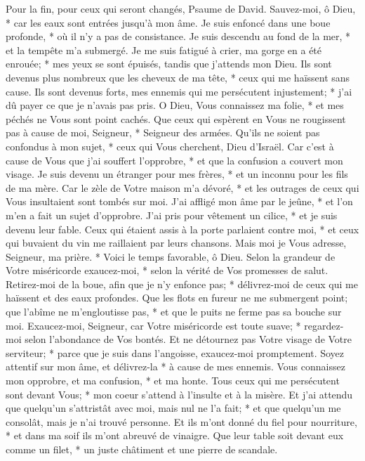 Pour la fin, pour ceux qui seront changés, Psaume de David.
Sauvez-moi, ô Dieu, * car les eaux sont entrées jusqu'à mon âme.
Je suis enfoncé dans une boue profonde, * où il n'y a pas de consistance. Je suis descendu au fond de la mer, * et la tempête m'a submergé.
Je me suis fatigué à crier, ma gorge en a été enrouée; * mes yeux se sont épuisés, tandis que j'attends mon Dieu.
Ils sont devenus plus nombreux que les cheveux de ma tête, * ceux qui me haïssent sans cause. Ils sont devenus forts, mes ennemis qui me persécutent injustement; * j'ai dû payer ce que je n'avais pas pris.
O Dieu, Vous connaissez ma folie, * et mes péchés ne Vous sont point cachés.
Que ceux qui espèrent en Vous ne rougissent pas à cause de moi, Seigneur, * Seigneur des armées. Qu'ils ne soient pas confondus à mon sujet, * ceux qui Vous cherchent, Dieu d'Israël.
Car c'est à cause de Vous que j'ai souffert l'opprobre, * et que la confusion a couvert mon visage.
Je suis devenu un étranger pour mes frères, * et un inconnu pour les fils de ma mère.
Car le zèle de Votre maison m'a dévoré, * et les outrages de ceux qui Vous insultaient sont tombés sur moi.
J'ai affligé mon âme par le jeûne, * et l'on m'en a fait un sujet d'opprobre.
J'ai pris pour vêtement un cilice, * et je suis devenu leur fable.
Ceux qui étaient assis à la porte parlaient contre moi, * et ceux qui buvaient du vin me raillaient par leurs chansons.
Mais moi je Vous adresse, Seigneur, ma prière. * Voici le temps favorable, ô Dieu. Selon la grandeur de Votre miséricorde exaucez-moi, * selon la vérité de Vos promesses de salut.
Retirez-moi de la boue, afin que je n'y enfonce pas; * délivrez-moi de ceux qui me haïssent et des eaux profondes.
Que les flots en fureur ne me submergent point; que l'abîme ne m'engloutisse pas, * et que le puits ne ferme pas sa bouche sur moi.
Exaucez-moi, Seigneur, car Votre miséricorde est toute suave; * regardez- moi selon l'abondance de Vos bontés.
Et ne détournez pas Votre visage de Votre serviteur; * parce que je suis dans l'angoisse, exaucez-moi promptement.
Soyez attentif sur mon âme, et délivrez-la * à cause de mes ennemis.
Vous connaissez mon opprobre, et ma confusion, * et ma honte.
Tous ceux qui me persécutent sont devant Vous; * mon coeur s'attend à l'insulte et à la misère. Et j'ai attendu que quelqu'un s'attristât avec moi, mais nul ne l'a fait; * et que quelqu'un me consolât, mais je n'ai trouvé personne.
Et ils m'ont donné du fiel pour nourriture, * et dans ma soif ils m'ont abreuvé de vinaigre.
Que leur table soit devant eux comme un filet, * un juste châtiment et une pierre de scandale.
